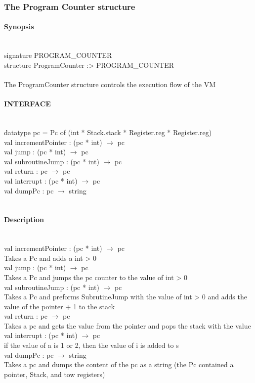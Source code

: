 \documentclass{article}
\begin{document}
\subsubsection{The Program Counter structure}
\paragraph{Synopsis} \
\\
signature PROGRAM_COUNTER\\
structure ProgramCounter :> PROGRAM_COUNTER\\
\\
The ProgramCounter structure controls the execution flow of the VM
\\
\paragraph{INTERFACE} \
\\
	datatype pc = Pc of (int * Stack.stack * Register.reg * Register.reg)
\\
	val incrementPointer : (pc * int) $\rightarrow$ pc\\
	val jump : (pc * int) $\rightarrow$ pc\\
	val subroutineJump : (pc * int) $\rightarrow$ pc\\
	val return : pc $\rightarrow$ pc\\
    val interrupt : (pc * int) $\rightarrow$ pc\\
    val dumpPc : pc $\rightarrow$ string\\
\\
\paragraph{Description} \
\\
	val incrementPointer : (pc * int) $\rightarrow$ pc\\
		Takes a Pc and adds a int > 0\\
	val jump : (pc * int) $\rightarrow$ pc\\
		Takes a Pc and jumps the pc counter to the value of int > 0\\
	val subroutineJump : (pc * int) $\rightarrow$ pc\\
		Takes a Pc and preforms SubrutineJump with the value of  int > 0 and adds the  value of the pointer + 1 to the stack\\
	val return : pc $\rightarrow$ pc\\
    	Takes a pc and gets the value from the pointer and pops the stack with the value\\
	val interrupt : (pc * int) $\rightarrow$ pc\\
		if the value of a is 1 or 2, then the value of i is added to s\\
	val dumpPc : pc $\rightarrow$ string\\
		Takes a pc and dumps the content of the pc as a string (the Pc contained a pointer, Stack, and tow registers)\\
\end{document}
